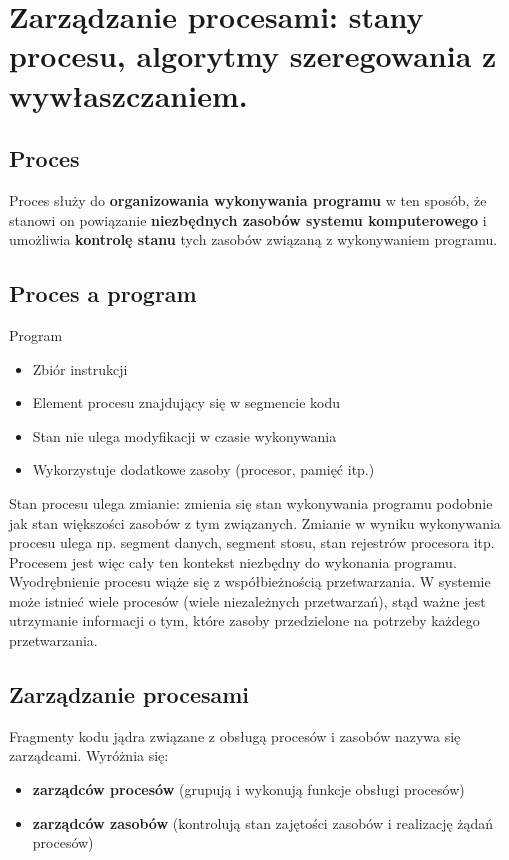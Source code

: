 \documentclass[main.tex]{subfiles}
\begin{document}
    \newpage

    \section{Zarządzanie procesami: stany procesu, algorytmy szeregowania z wywłaszczaniem.}
    \subsection{Proces}
    Proces służy do \textbf{organizowania wykonywania programu} w ten sposób, że stanowi on powiązanie \textbf{niezbędnych zasobów systemu komputerowego} i umożliwia \textbf{kontrolę stanu} tych zasobów związaną z wykonywaniem programu.


    \subsection{Proces a program}
    Program
    \begin{itemize}
        \item Zbiór instrukcji
        \item Element procesu znajdujący się w segmencie kodu
        \item Stan nie ulega modyfikacji w czasie wykonywania
        \item Wykorzystuje dodatkowe zasoby (procesor, pamięć itp.)
    \end{itemize}

    Stan procesu ulega zmianie: zmienia się stan wykonywania programu podobnie jak stan większości zasobów z tym związanych. Zmianie w wyniku wykonywania procesu ulega np. segment danych, segment stosu, stan rejestrów procesora itp. Procesem jest więc cały ten kontekst niezbędny do wykonania programu. Wyodrębnienie procesu wiąże się z współbieżnością przetwarzania. W systemie może istnieć wiele procesów (wiele niezależnych przetwarzań), stąd ważne jest utrzymanie informacji o tym, które zasoby przedzielone na potrzeby każdego przetwarzania.

    \subsection{Zarządzanie procesami}

    Fragmenty kodu jądra związane z obsługą procesów i zasobów nazywa się zarządcami.
    Wyróżnia się:
    \begin{itemize}
        \item \textbf{zarządców procesów} (grupują i wykonują funkcje obsługi procesów)
        \item \textbf{zarządców zasobów} (kontrolują stan zajętości zasobów i realizację żądań procesów)
    \end{itemize}
\end{document}
